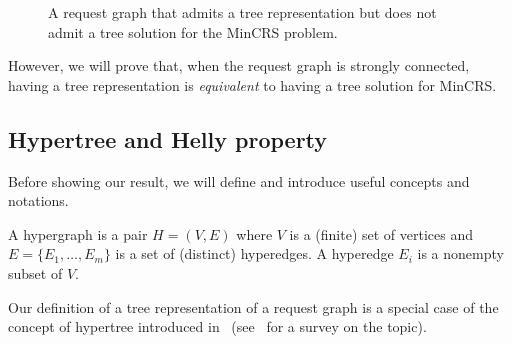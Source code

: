 \documentclass[11pt]{article}%
\begin{document}
    \begin{figure}[!ht]
      \centering
      \caption{A request graph that admits a tree representation but does not admit a tree solution for the MinCRS problem.}
\label{fig:c-ex_tree-rep}
    \end{figure}



However, we will prove that, when the request graph is strongly connected, having a tree representation is {\it equivalent} to having a tree solution for MinCRS. 


\subsection{Hypertree and Helly property}

Before showing our result, we will define and introduce useful concepts and notations. 

\begin{definition}[Hypergraph]
A hypergraph is a pair $H=(V,E)$ where $V$ is a (finite) set of vertices and $E=\{E_1,\dots,E_m\}$ is a set of (distinct) hyperedges. A hyperedge $E_i$ is a nonempty subset of $V$. 
\end{definition} 

Our definition of a tree representation of a request graph is a special case of the concept of hypertree introduced in~\cite{flament1978} (see~\cite{difonzo2025} for a survey on the topic). 
\end{document}
